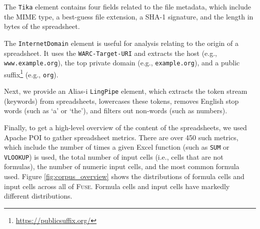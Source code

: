 \documentclass[conference]{IEEEtran}
\begin{document}
The \texttt{Tika} element contains four fields related to the file metadata, which include the MIME type, a best-guess file extension, a SHA-1 signature, and the length in bytes of the spreadsheet.


The \texttt{InternetDomain} element is useful for analysis relating to the origin of a spreadsheet. It uses the \texttt{WARC-Target-URI} and extracts the host (e.g., \texttt{www.example.org}), the top private domain (e.g., \texttt{example.org}), and a public suffix\footnote{\url{https://publicsuffix.org/}} (e.g., \texttt{org}).


Next, we provide an Alias-i \texttt{LingPipe} element, which extracts the token stream (keywords) from spreadsheets, lowercases these tokens, removes English stop words (such as `a' or `the'), and filters out non-words (such as numbers).


Finally, to get a high-level overview of the content of the spreadsheets, we used Apache POI to gather spreadsheet metrics. There are over 450 such metrics, which include the number of times a given Excel function (such as \texttt{SUM} or \texttt{VLOOKUP}) is used, the total number of input cells (i.e., cells that are not formulas), the number of numeric input cells, and the most common formula used. 
%
Figure \ref{fig:corpus_overview} shows the distributions of formula cells
and input cells across all of \textsc{Fuse}. Formula cells and input cells have markedly different distributions.
\end{document}
